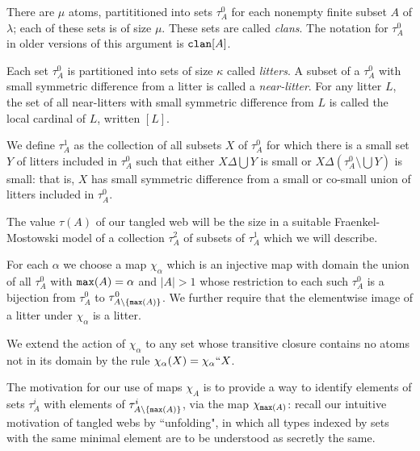 \documentclass{slides}
\begin{document}
\begin{slide}

There are $\mu$ atoms, partititioned into sets $\tau^0_A$ for each nonempty finite subset $A$ of $\lambda$;  each of these sets is of size $\mu$.  These sets are called {\em clans\/}.  The notation for $\tau^0_A$ in older versions of this argument is ${\tt clan}[A]$.

Each set $\tau^0_A$ is partitioned into sets of size $\kappa$ called {\em litters\/}.  A subset of a $\tau^0_A$  with small symmetric difference from a litter is called a {\em near-litter\/}.  For any litter $L$, the set of all near-litters with small symmetric difference from $L$ is called the local cardinal of $L$, written $[L]$.

We define $\tau^1_A$ as the collection of all subsets $X$ of $\tau^0_A$ for which there is a small set $Y$  of litters included in $\tau^0_A$ such that either
$X \Delta \bigcup Y$ is small or $X \Delta (\tau^0_A \setminus \bigcup Y)$ is small:  that is, $X$ has small symmetric difference from a small or co-small union of litters
included in $\tau^0_A$.

The value $\tau(A)$ of our tangled web will be the size in a suitable Fraenkel-Mostowski model of a collection $\tau^2_A$ of subsets of $\tau^1_A$ which we will describe.

\end{slide}

\begin{slide}

For each $\alpha$ we choose a map $\chi_\alpha$ which is an injective map with domain the union of all $\tau^0_A$ with ${\tt max}(A)=\alpha$ and $|A|>1$ whose restriction
to each such $\tau^0_A$ is a bijection from $\tau^0_A$ to $\tau^0_{A\setminus \{{\tt max}(A)\}}$.  We further require that the elementwise image of a litter under $\chi_\alpha$ is a litter.



We extend the action of $\chi_\alpha$ to any set whose transitive closure contains no atoms not in its domain by the rule $\chi_\alpha(X) = \chi_\alpha``X$.

The motivation for our use of maps $\chi_A$ is to provide a way to identify elements of sets $\tau^i_A$ with elements of $\tau^i_{A \setminus \{{\tt max}(A)\}}$, via the
map $\chi_{{\tt max}(A)}$:  recall our intuitive motivation of tangled webs by ``unfolding", in which all types indexed by sets with the same minimal element are to be understood as secretly the same.

\end{slide}
\end{document}
